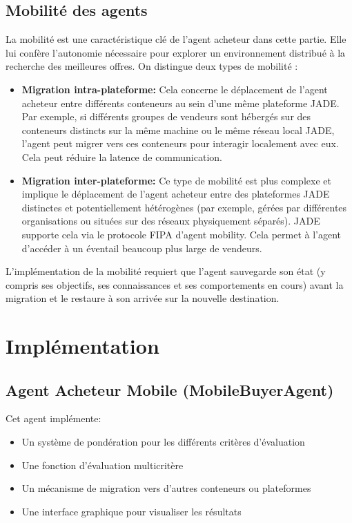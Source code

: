 \documentclass[a4paper,12pt]{report}
\begin{document}
\subsection{Mobilité des agents}
La mobilité est une caractéristique clé de l'agent acheteur dans cette partie. Elle lui confère l'autonomie nécessaire pour explorer un environnement distribué à la recherche des meilleures offres. On distingue deux types de mobilité :
\begin{itemize}
    \item \textbf{Migration intra-plateforme:} Cela concerne le déplacement de l'agent acheteur entre différents conteneurs au sein d'une même plateforme JADE. Par exemple, si différents groupes de vendeurs sont hébergés sur des conteneurs distincts sur la même machine ou le même réseau local JADE, l'agent peut migrer vers ces conteneurs pour interagir localement avec eux. Cela peut réduire la latence de communication.
    \item \textbf{Migration inter-plateforme:} Ce type de mobilité est plus complexe et implique le déplacement de l'agent acheteur entre des plateformes JADE distinctes et potentiellement hétérogènes (par exemple, gérées par différentes organisations ou situées sur des réseaux physiquement séparés). JADE supporte cela via le protocole FIPA d'agent mobility. Cela permet à l'agent d'accéder à un éventail beaucoup plus large de vendeurs.
\end{itemize}
L'implémentation de la mobilité requiert que l'agent sauvegarde son état (y compris ses objectifs, ses connaissances et ses comportements en cours) avant la migration et le restaure à son arrivée sur la nouvelle destination.

\section{Implémentation}
\subsection{Agent Acheteur Mobile (MobileBuyerAgent)}
Cet agent implémente:
\begin{itemize}
    \item Un système de pondération pour les différents critères d'évaluation
    \item Une fonction d'évaluation multicritère
    \item Un mécanisme de migration vers d'autres conteneurs ou plateformes
    \item Une interface graphique pour visualiser les résultats
\end{itemize}
\end{document}
